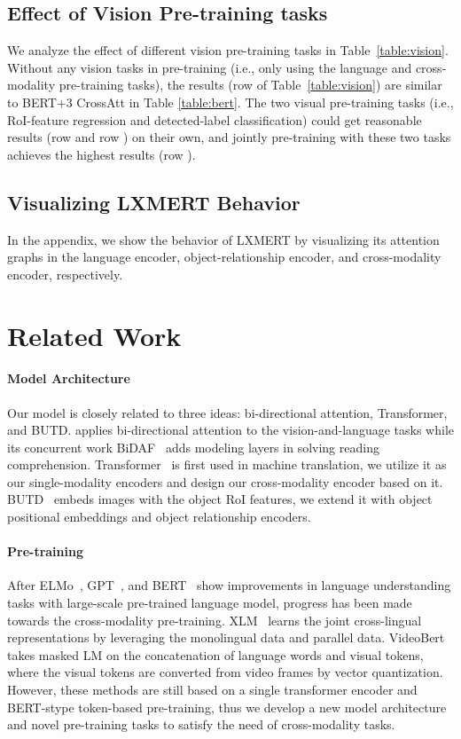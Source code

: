 \documentclass[11pt,a4paper]{article}
\begin{document}
\subsection{Effect of Vision Pre-training tasks}
\label{sec:vision_analysis}
We analyze the effect of different vision pre-training tasks in Table~\ref{table:vision}.
Without any vision tasks in pre-training (i.e., only using the language and cross-modality pre-training tasks), the results (row  of Table~\ref{table:vision}) are similar to BERT+3 CrossAtt in Table \ref{table:bert}.
The two visual pre-training tasks (i.e., RoI-feature regression and detected-label classification) could get reasonable results (row  and row ) on their own, and jointly pre-training with these two tasks achieves the highest results (row ).



\subsection{Visualizing LXMERT Behavior}
In the appendix, we show the behavior of LXMERT by visualizing its attention graphs in the {language encoder}, {object-relationship encoder}, and {cross-modality encoder}, respectively. \section{Related Work}
\paragraph{Model Architecture} Our model is closely related to three ideas: bi-directional attention, Transformer, and BUTD.
 applies bi-directional attention to the vision-and-language tasks while its concurrent work BiDAF~\cite{seo2016bidirectional} adds modeling layers in solving reading comprehension.
Transformer~\cite{vaswani2017attention} is first used in machine translation, we utilize it as our single-modality encoders and design our cross-modality encoder based on it.
BUTD~\cite{anderson2018bottom} embeds images with the object RoI features, we extend it with object positional embeddings and object relationship encoders.

\paragraph{Pre-training} After ELMo~\cite{peters2018deep}, GPT~\cite{radford2018improving}, and BERT~\cite{devlin2018bert} show improvements in language understanding tasks with large-scale pre-trained language model, progress has been made towards the cross-modality pre-training.
XLM~\cite{lample2019cross} learns the joint cross-lingual representations by leveraging the monolingual data and parallel data.
VideoBert~\cite{sun2019videobert} takes masked LM on the concatenation of language words and visual tokens, where the visual tokens are converted from video frames by vector quantization.
However, these methods are still based on a single transformer encoder and BERT-stype token-based pre-training, thus we develop a new model architecture and novel pre-training tasks to satisfy the need of cross-modality tasks.
\end{document}
